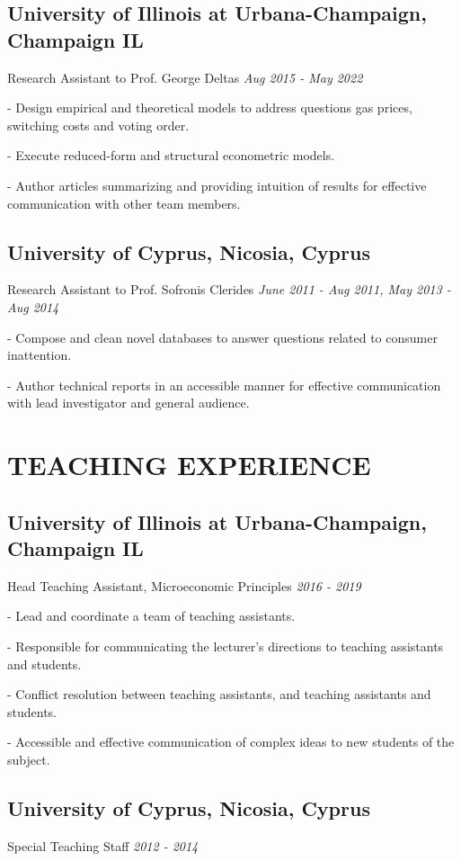 \documentclass{article}
\begin{document}
\subsection{\textbf{University of Illinois at Urbana-Champaign}, Champaign IL}
Research Assistant to Prof. George Deltas \hfill \emph{Aug 2015 - May 2022}

- Design empirical and theoretical models to address questions gas prices, switching costs and voting order.

- Execute reduced-form and structural econometric models.

- Author articles summarizing and providing intuition of results for effective communication with other team members.


\subsection{\textbf{University of Cyprus}, Nicosia, Cyprus}
Research Assistant to Prof. Sofronis Clerides \hfill \emph{June 2011 - Aug 2011, May 2013 - Aug 2014}

- Compose and clean novel databases to answer questions related to consumer inattention.

- Author technical reports in an accessible manner for effective communication with lead investigator and general audience.


\section{TEACHING EXPERIENCE}
\subsection{\textbf{University of Illinois at Urbana-Champaign}, Champaign IL}
Head Teaching Assistant, Microeconomic Principles \hfill \emph{2016 - 2019}

- Lead and coordinate a team of teaching assistants.

- Responsible for communicating the lecturer's directions to teaching assistants and students.

- Conflict resolution between teaching assistants, and teaching assistants and students.

- Accessible and effective communication of complex ideas to new students of the subject.


\subsection{\textbf{University of Cyprus}, Nicosia, Cyprus}
Special Teaching Staff \hfill \emph{2012 - 2014}
\end{document}
